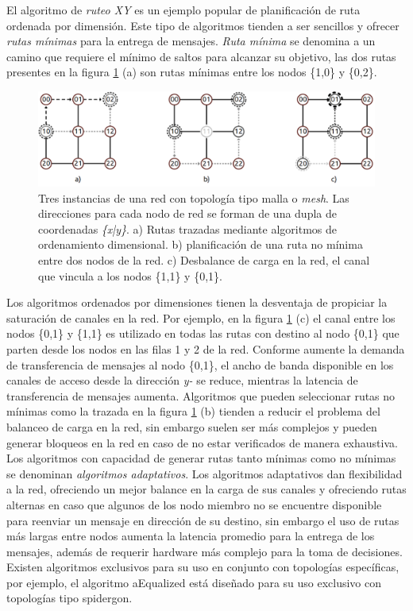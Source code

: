 El algoritmo de \textit{ruteo XY}\cite{chapter1:Priyanka:2013:IJCA} es un ejemplo popular de planificación de ruta ordenada por dimensión. Este tipo de algoritmos tienden a ser sencillos y ofrecer \textit{rutas mínimas} para la entrega de mensajes. \textit{Ruta mínima} se denomina a un camino que requiere el mínimo de saltos para alcanzar su objetivo, las dos rutas presentes en la figura \ref{fig:ch1_ruteo} (a) son rutas mínimas entre los nodos \{1,0\} y \{0,2\}.

\begin{figure}
	\begin{center}
		\includegraphics[scale=0.7]{figures/ch1_ruteo.png}
	\end{center}
	\caption
		{	
			Tres instancias de una red con topología tipo malla o \textit{mesh}. Las direcciones para cada nodo de red se forman de una dupla de coordenadas \textit{\{x|y\}}. a) Rutas trazadas mediante algoritmos de ordenamiento dimensional. b) planificación de una ruta no mínima entre dos nodos de la red. c) Desbalance de carga en la red, el canal que vincula a los nodos \{1,1\} y \{0,1\}.
		}
	\label{fig:ch1_ruteo}
\end{figure}

Los algoritmos ordenados por dimensiones tienen la desventaja de propiciar la saturación de canales en la red. Por ejemplo, en la figura \ref{fig:ch1_ruteo} (c) el canal entre los nodos \{0,1\} y \{1,1\} es utilizado en todas las rutas con destino al nodo \{0,1\} que parten desde los nodos en las filas 1 y 2 de la red. Conforme aumente la demanda de transferencia de mensajes al nodo \{0,1\}, el ancho de banda disponible en los canales de acceso desde la dirección \textit{y-} se reduce, mientras la latencia de transferencia de mensajes aumenta. Algoritmos que pueden seleccionar rutas no mínimas como la trazada en la figura \ref{fig:ch1_ruteo} (b) tienden a reducir el problema del balanceo de carga en la red, sin embargo suelen ser más complejos y pueden generar bloqueos en la red en caso de no estar verificados de manera exhaustiva. Los algoritmos con capacidad de generar rutas tanto mínimas como no mínimas se denominan \textit{algoritmos adaptativos}. Los algoritmos adaptativos dan flexibilidad a la red, ofreciendo un mejor balance en la carga de sus canales y ofreciendo rutas alternas en caso que algunos de los nodo miembro no se encuentre disponible para reenviar un mensaje en dirección de su destino, sin embargo el uso de rutas más largas entre nodos aumenta la latencia promedio para la entrega de los mensajes, además de requerir hardware más complejo para la toma de decisiones. Existen algoritmos exclusivos para su uso en conjunto con topologías específicas, por ejemplo, el algoritmo aEqualized\cite{chapter1:5090764} está diseñado para su uso exclusivo con topologías tipo spidergon.





